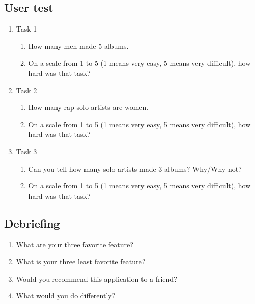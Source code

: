 \documentclass[a4paper, 11pt, oneside]{article}
\begin{document}
\subsection{User test}
\begin{enumerate}
    \item Task 1
          \begin{enumerate}
              \item How many men made 5 albums.
              \item On a scale from 1 to 5 (1 means very easy, 5 means very difficult), how hard was that task?
          \end{enumerate}
    \item Task 2
          \begin{enumerate}
              \item How many rap solo artists are women.
              \item On a scale from 1 to 5 (1 means very easy, 5 means very difficult), how hard was that task?
          \end{enumerate}
    \item Task 3
          \begin{enumerate}
              \item Can you tell how many solo artists made 3 albums? Why/Why not?
              \item On a scale from 1 to 5 (1 means very easy, 5 means very difficult), how hard was that task?
          \end{enumerate}
\end{enumerate}

\subsection{Debriefing}
\begin{enumerate}
    \item What are your three favorite feature?
    \item What is your three least favorite feature?
    \item Would you recommend this application to a friend?
    \item What would you do differently?
\end{enumerate}
\end{document}
